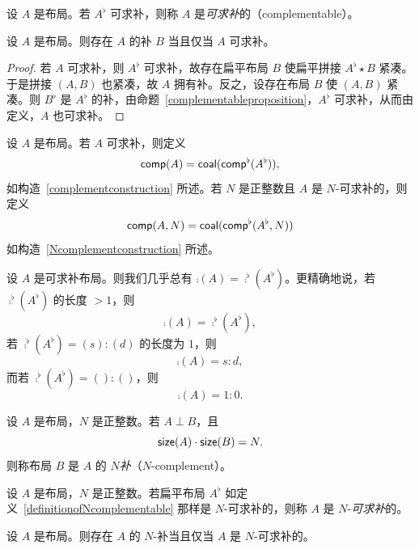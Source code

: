 \begin{definition}
    设 $A$ 是布局。若 $A^\flat$ 可求补，则称 $A$ 是{\it 可求补}的（complementable）。
\end{definition}

\begin{lemma}
    设 $A$ 是布局。则存在 $A$ 的补 $B$ 当且仅当 $A$ 可求补。
\end{lemma}
\begin{proof}
    若 $A$ 可求补，则 $A^\flat$ 可求补，故存在扁平布局 $B$ 使扁平拼接 $A^\flat \star B$ 紧凑。于是拼接 $(A , B)$ 也紧凑，故 $A$ 拥有补。反之，设存在布局 $B$ 使 $(A,B)$ 紧凑。则 $B^\flat$ 是 $A^\flat$ 的补，由命题~\ref{complementableproposition}，$A^\flat$ 可求补，从而由定义，$A$ 也可求补。
\end{proof}

\begin{definition}\label{definitionoflayoutcomplements}
    设 $A$ 是布局。若 $A$ 可求补，则定义
    \[
    \mathsf{comp}(A) = \mathsf{coal}(\mathsf{comp}^\flat(A^\flat)),
    \]
    如构造~\ref{complementconstruction} 所述。若 $N$ 是正整数且 $A$ 是 $N$-可求补的，则定义
    \[
    \mathsf{comp}(A,N) = \mathsf{coal}(\mathsf{comp}^\flat(A^\flat,N))
    \]
    如构造~\ref{Ncomplementconstruction} 所述。
\end{definition}
\begin{remark}
    设 $A$ 是可求补布局。则我们几乎总有 $\comp(A) = \comp^\flat(A^\flat)$。更精确地说，若 $\comp^\flat(A^\flat)$ 的长度 $>1$，则
    \[
    \comp(A) = \comp^\flat(A^\flat),
    \]
    若 $\comp^\flat(A^\flat) = (s):(d)$ 的长度为 $1$，则
    \[
    \comp(A) = s:d,
    \]
    而若 $\comp^\flat(A^\flat) = ():()$，则
    \[
    \comp(A) = 1:0.
    \]
\end{remark}

\begin{definition}
    设 $A$ 是布局，$N$ 是正整数。若 $A \perp B$，且
    \[
    \mathsf{size}(A) \cdot \mathsf{size}(B) = N.
    \]
    则称布局 $B$ 是 $A$ 的 $N${\it 补}（$N$-complement）。
\end{definition}

\begin{definition}
    设 $A$ 是布局，$N$ 是正整数。若扁平布局 $A^\flat$ 如定义~\ref{definitionofNcomplementable} 那样是 $N$-可求补的，则称 $A$ 是 $N$-{\it 可求补}的。
\end{definition}

\begin{proposition}
    设 $A$ 是布局。则存在 $A$ 的 $N$-补当且仅当 $A$ 是 $N$-可求补的。
\end{proposition}

